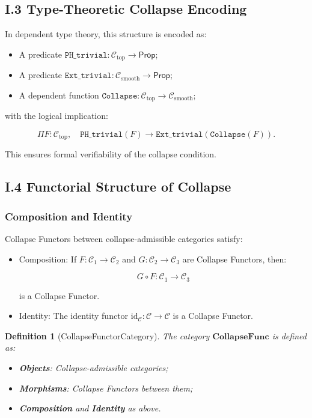 \documentclass[11pt]{article}
\newtheorem{definition}[theorem]{Definition}
\begin{document}
\subsection*{I.3 Type-Theoretic Collapse Encoding}

In dependent type theory, this structure is encoded as:

\begin{itemize}
    \item A predicate \( \texttt{PH\_trivial} : \mathcal{C}_{\mathrm{top}} \to \mathsf{Prop} \);
    \item A predicate \( \texttt{Ext\_trivial} : \mathcal{C}_{\mathrm{smooth}} \to \mathsf{Prop} \);
    \item A dependent function \( \texttt{Collapse} : \mathcal{C}_{\mathrm{top}} \to \mathcal{C}_{\mathrm{smooth}} \);
\end{itemize}

with the logical implication:

\[
\Pi F : \mathcal{C}_{\mathrm{top}}, \quad \texttt{PH\_trivial}(F) \to \texttt{Ext\_trivial}(\texttt{Collapse}(F)).
\]

This ensures formal verifiability of the collapse condition.

\subsection*{I.4 Functorial Structure of Collapse}

\subsubsection*{Composition and Identity}

Collapse Functors between collapse-admissible categories satisfy:

\begin{itemize}
    \item Composition: If \( F : \mathcal{C}_1 \to \mathcal{C}_2 \) and \( G : \mathcal{C}_2 \to \mathcal{C}_3 \) are Collapse Functors, then:

\[
G \circ F : \mathcal{C}_1 \to \mathcal{C}_3
\]

is a Collapse Functor.

    \item Identity: The identity functor \( \mathrm{id}_{\mathcal{C}} : \mathcal{C} \to \mathcal{C} \) is a Collapse Functor.
\end{itemize}

\begin{definition}[CollapseFunctorCategory]
The category \( \mathbf{CollapseFunc} \) is defined as:

\begin{itemize}
    \item \textbf{Objects}: Collapse-admissible categories;
    \item \textbf{Morphisms}: Collapse Functors between them;
    \item \textbf{Composition} and \textbf{Identity} as above.
\end{itemize}
\end{definition}
\end{document}
